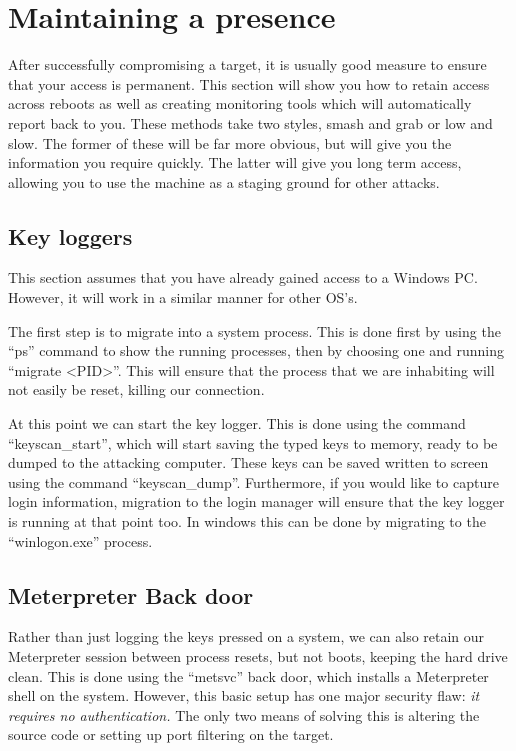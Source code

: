 \documentclass[a4paper,11pt]{report}
\begin{document}
	\section{Maintaining a presence}
		After successfully compromising a target, it is usually good measure to ensure that your access is permanent. 
		This section will show you how to retain access across reboots as well as creating monitoring tools which will automatically report back to you. 
		These methods take two styles, smash and grab or low and slow. 
		The former of these will be far more obvious, but will give you the information you require quickly. 
		The latter will give you long term access, allowing you to use the machine as a staging ground for other attacks. 

		\subsection{Key loggers}
			This section assumes that you have already gained access to a Windows PC. 
			However, it will work in a similar manner for other OS's. 
			
			The first step is to migrate into a system process. 
			This is done first by using the ``ps'' command to show the running processes, 
			then by choosing one and running ``migrate <PID>''. 
			This will ensure that the process that we are inhabiting will not easily be reset, killing our connection. 

			At this point we can start the key logger.
			This is done using the command ``keyscan\_start'', 
			which will start saving the typed keys to memory, ready to be dumped to the attacking computer. 
			These keys can be saved written to screen using the command ``keyscan\_dump''. 
			Furthermore, if you would like to capture login information, migration to the login manager will ensure that the key logger is running at that point too. 
			In windows this can be done by migrating to the ``winlogon.exe'' process. 
		\subsection{Meterpreter Back door}
			Rather than just logging the keys pressed on a system, we can also retain our Meterpreter session between process resets, but not boots, keeping the hard drive clean.  
			This is done using the ``metsvc'' back door, which installs a Meterpreter shell on the system. 
			However, this basic setup has one major security flaw: \emph{it requires no authentication.}
			The only two means of solving this is altering the source code or setting up port filtering on the target. 
\end{document}
